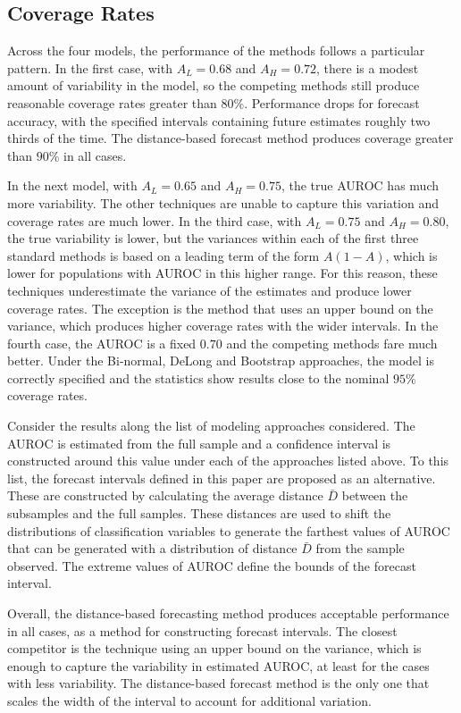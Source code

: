 \subsection{Coverage Rates}


Across the four models, the performance of the methods follows a particular pattern.
In the first case, with $A_L = 0.68$ and $A_H = 0.72$, there is a modest amount of variability in the model, so the competing methods still produce reasonable coverage rates greater than $80\%$.
Performance drops for forecast accuracy, with the specified intervals containing future estimates roughly two thirds of the time.
The distance-based forecast method produces coverage greater than $90\%$ in all cases.

In the next model, with $A_L = 0.65$ and $A_H = 0.75$, the true AUROC has much more variability.
The other techniques are unable to capture this variation and coverage rates are much lower.
In the third case, with $A_L = 0.75$ and $A_H = 0.80$, the true variability is lower, but the variances within each of the first three standard methods is based on a leading term of the form $A(1-A)$, which is lower for populations with AUROC in this higher range.
For this reason, these techniques underestimate the variance of the estimates and produce lower coverage rates.
The exception is the method that uses an upper bound on the variance, which produces higher coverage rates with the wider intervals.
In the fourth case, the AUROC is a fixed $0.70$ and the competing methods fare much better.
Under the Bi-normal, DeLong and Bootstrap approaches, the model is correctly specified and the statistics show results close to the nominal $95\%$ coverage rates.


Consider the results along the list of modeling approaches considered.
The AUROC is estimated from the full sample and a confidence interval is constructed around this value under each of the approaches listed above.
To this list, the forecast intervals defined in this paper are proposed as an alternative.
These are constructed by calculating the average distance $\bar{D}$ between the subsamples and the full samples.
These distances are used to shift the distributions of classification variables to generate the farthest values of AUROC that can be generated with a distribution of distance $\bar{D}$ from the sample observed.
The extreme values of AUROC define the bounds of the forecast interval.

Overall, the distance-based forecasting method produces acceptable performance in all cases, as a method for constructing forecast intervals.
The closest competitor is the technique using an upper bound on the variance, which is enough to capture the variability in estimated AUROC, at least for the cases with less variability.
The distance-based forecast method is the only one that scales the width of the interval to account for additional variation.



